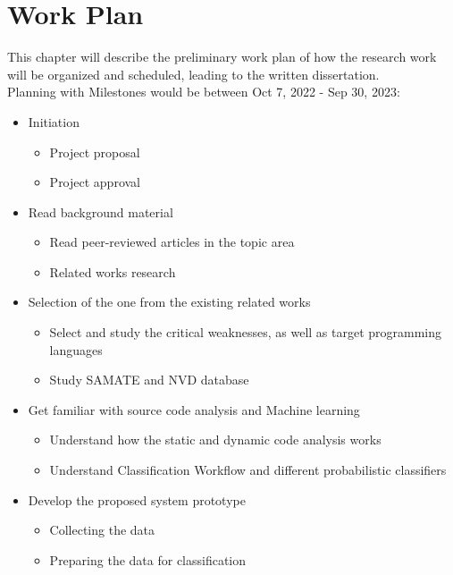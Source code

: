 % 
%  
%

\chapter{Work Plan}
\label{cha:Work_Plan}

This chapter will describe the preliminary work plan of how the research work will be organized and scheduled, leading to the written dissertation.\\

Planning with Milestones would be between Oct 7, 2022 - Sep 30, 2023:

\begin{itemize}
\item  Initiation
     \begin{itemize}
         \item Project proposal
         \item Project approval
       \end{itemize}
\item  Read background material
     \begin{itemize}
         \item 	Read peer-reviewed articles in the topic area
         \item Related works research
       \end{itemize}
\item  Selection of the one from the existing related works
     \begin{itemize}
         \item Select and study the critical weaknesses, as well as target programming languages
         \item Study SAMATE and NVD database
       \end{itemize}
\item Get familiar with source code analysis and Machine learning
     \begin{itemize}
         \item Understand how the static and dynamic code analysis works
         \item Understand Classification  Workflow and different probabilistic classifiers
       \end{itemize}
\item Develop the proposed system prototype
     \begin{itemize}
         \item Collecting the data
         \item Preparing the data for classification

\end{itemize}
\end{itemize}

